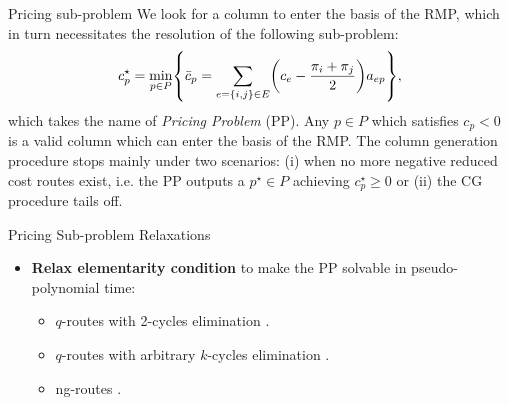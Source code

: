 \begin{frame}{Pricing sub-problem}
	We look for a column to enter the basis of the RMP,
	which in turn necessitates the resolution of the following sub-problem:
	\begin{equation}\label{eq:pp-problem-2nd-time}
		{c^\star_p} = \min_{p \in P} \Set*{ \bar{c}_p = \sum_{e = \Set*{i, j} \in E} \Expr*{c_{e} - \frac{\pi_i + \pi_j}{2}} a_{ep}  },
	\end{equation}
	which takes the name of \textit{Pricing Problem} (PP).
	Any $p \in P$ which satisfies $c_p < 0$ is a valid column which can enter the basis of the RMP.
	The column generation procedure stops mainly under two scenarios:
	(i) when no more negative reduced cost routes exist,
	i.e. the PP outputs a $p^\star \in P$ achieving $c^\star_p \ge 0$
	or
	(ii) the CG procedure tails off.

\end{frame}

\begin{frame}{Pricing Sub-problem Relaxations}
	\begin{itemize}
		\item \textbf{Relax elementarity condition} to make the PP solvable in pseudo-polynomial time:
		      \begin{itemize}
			      \item $q$-routes with 2-cycles elimination \parencite{christofides1981exact}.
			      \item $q$-routes with arbitrary $k$-cycles elimination \parencite{feillet2004, chabrier2006}.
			      \item ng-routes \parencite{baldacci2011}.
		      \end{itemize}
	\end{itemize}
\end{frame}

